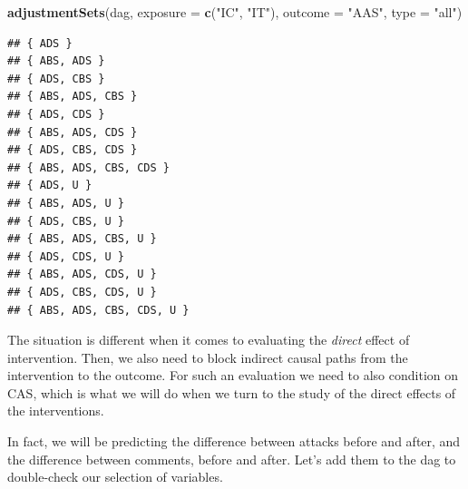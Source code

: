 \documentclass[10pt,dvipsnames,enabledeprecatedfontcommands]{scrartcl}
\newenvironment{Shaded}{\begin{snugshade}}{\end{snugshade}}
\newcommand{\KeywordTok}[1]{\textcolor[rgb]{0.13,0.29,0.53}{\textbf{#1}}}
\newcommand{\DataTypeTok}[1]{\textcolor[rgb]{0.13,0.29,0.53}{#1}}
\newcommand{\StringTok}[1]{\textcolor[rgb]{0.31,0.60,0.02}{#1}}
\newcommand{\NormalTok}[1]{#1}
\begin{document}
\vspace{1mm} \footnotesize

\begin{Shaded}
\begin{Highlighting}[]
\KeywordTok{adjustmentSets}\NormalTok{(dag, }\DataTypeTok{exposure =} \KeywordTok{c}\NormalTok{(}\StringTok{"IC"}\NormalTok{, }\StringTok{"IT"}\NormalTok{), }\DataTypeTok{outcome =} \StringTok{"AAS"}\NormalTok{, }\DataTypeTok{type =} \StringTok{"all"}\NormalTok{)}
\end{Highlighting}
\end{Shaded}

\begin{verbatim}
## { ADS }
## { ABS, ADS }
## { ADS, CBS }
## { ABS, ADS, CBS }
## { ADS, CDS }
## { ABS, ADS, CDS }
## { ADS, CBS, CDS }
## { ABS, ADS, CBS, CDS }
## { ADS, U }
## { ABS, ADS, U }
## { ADS, CBS, U }
## { ABS, ADS, CBS, U }
## { ADS, CDS, U }
## { ABS, ADS, CDS, U }
## { ADS, CBS, CDS, U }
## { ABS, ADS, CBS, CDS, U }
\end{verbatim}

\normalsize

The situation is different when it comes to evaluating the \emph{direct}
effect of intervention. Then, we also need to block indirect causal
paths from the intervention to the outcome. For such an evaluation we
need to also condition on \textsf{CAS}, which is what we will do when we
turn to the study of the direct effects of the interventions.

In fact, we will be predicting the difference between attacks before and
after, and the difference between comments, before and after. Let's add
them to the dag to double-check our selection of variables.
\end{document}
